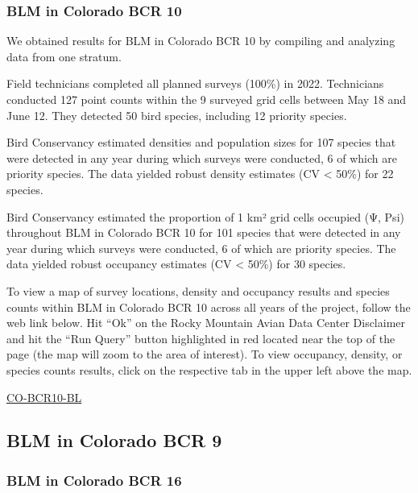 \documentclass[
  letterpaper,
  DIV=11,
  numbers=noendperiod,
  oneside]{scrreprt}
\begin{document}
\hypertarget{blm-in-colorado-bcr-10-1}{%
\subsubsection{BLM in Colorado BCR 10}\label{blm-in-colorado-bcr-10-1}}

We obtained results for BLM in Colorado BCR 10 by compiling and
analyzing data from one stratum.

Field technicians completed all planned surveys (100\%) in 2022.
Technicians conducted 127 point counts within the 9 surveyed grid cells
between May 18 and June 12. They detected 50 bird species, including 12
priority species.

Bird Conservancy estimated densities and population sizes for 107
species that were detected in any year during which surveys were
conducted, 6 of which are priority species. The data yielded robust
density estimates (CV \textless{} 50\%) for 22 species.

Bird Conservancy estimated the proportion of 1 km² grid cells occupied
(Ψ, Psi) throughout BLM in Colorado BCR 10 for 101 species that were
detected in any year during which surveys were conducted, 6 of which are
priority species. The data yielded robust occupancy estimates (CV
\textless{} 50\%) for 30 species.

To view a map of survey locations, density and occupancy results and
species counts within BLM in Colorado BCR 10 across all years of the
project, follow the web link below. Hit ``Ok'' on the Rocky Mountain
Avian Data Center Disclaimer and hit the ``Run Query'' button
highlighted in red located near the top of the page (the map will zoom
to the area of interest). To view occupancy, density, or species counts
results, click on the respective tab in the upper left above the map.

\href{http://www.rmbo.org/new_site/adc/QueryWindow.aspx\#N4IgzgLgTghhCuBbEAuABCAwgeQLQCFMAlARgAYCAZdfeKAUxnjQHsAzNSmAOwBM0AsjxgBzeonrcIIAL5A=}{CO-BCR10-BL}

\hypertarget{blm-in-colorado-bcr-9}{%
\subsection{BLM in Colorado BCR 9}\label{blm-in-colorado-bcr-9}}

\hypertarget{blm-in-colorado-bcr-16}{%
\subsubsection{BLM in Colorado BCR 16}\label{blm-in-colorado-bcr-16}}
\end{document}

